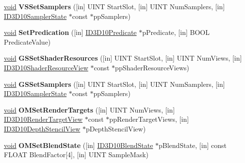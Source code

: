 \begin{DoxyCompactItemize}
\hyperlink{interfacevoid}{void} {\bfseries V\+S\+Set\+Samplers} (\mbox{[}in\mbox{]} U\+I\+NT Start\+Slot, \mbox{[}in\mbox{]} U\+I\+NT Num\+Samplers, \mbox{[}in\mbox{]} \hyperlink{interface_i_d3_d10_sampler_state}{I\+D3\+D10\+Sampler\+State} $\ast$const $\ast$pp\+Samplers)
\item 
\mbox{\label{interface_i_d3_d10_device_a479e83120b08a7be0742d63096b0d883}} 
\hyperlink{interfacevoid}{void} {\bfseries Set\+Predication} (\mbox{[}in\mbox{]} \hyperlink{interface_i_d3_d10_predicate}{I\+D3\+D10\+Predicate} $\ast$p\+Predicate, \mbox{[}in\mbox{]} B\+O\+OL Predicate\+Value)
\item 
\mbox{\label{interface_i_d3_d10_device_aa9fec48d096e7fb8b49b35e6c0209eda}} 
\hyperlink{interfacevoid}{void} {\bfseries G\+S\+Set\+Shader\+Resources} (\mbox{[}in\mbox{]} U\+I\+NT Start\+Slot, \mbox{[}in\mbox{]} U\+I\+NT Num\+Views, \mbox{[}in\mbox{]} \hyperlink{interface_i_d3_d10_shader_resource_view}{I\+D3\+D10\+Shader\+Resource\+View} $\ast$const $\ast$pp\+Shader\+Resource\+Views)
\item 
\mbox{\label{interface_i_d3_d10_device_a05a0765b1acbe6148dd96b9953fed9af}} 
\hyperlink{interfacevoid}{void} {\bfseries G\+S\+Set\+Samplers} (\mbox{[}in\mbox{]} U\+I\+NT Start\+Slot, \mbox{[}in\mbox{]} U\+I\+NT Num\+Samplers, \mbox{[}in\mbox{]} \hyperlink{interface_i_d3_d10_sampler_state}{I\+D3\+D10\+Sampler\+State} $\ast$const $\ast$pp\+Samplers)
\item 
\mbox{\label{interface_i_d3_d10_device_a5c010dbaa4d0118024a31a901c4270e9}} 
\hyperlink{interfacevoid}{void} {\bfseries O\+M\+Set\+Render\+Targets} (\mbox{[}in\mbox{]} U\+I\+NT Num\+Views, \mbox{[}in\mbox{]} \hyperlink{interface_i_d3_d10_render_target_view}{I\+D3\+D10\+Render\+Target\+View} $\ast$const $\ast$pp\+Render\+Target\+Views, \mbox{[}in\mbox{]} \hyperlink{interface_i_d3_d10_depth_stencil_view}{I\+D3\+D10\+Depth\+Stencil\+View} $\ast$p\+Depth\+Stencil\+View)
\item 
\mbox{\label{interface_i_d3_d10_device_a4b102a73ea3012820099f117521ef15c}} 
\hyperlink{interfacevoid}{void} {\bfseries O\+M\+Set\+Blend\+State} (\mbox{[}in\mbox{]} \hyperlink{interface_i_d3_d10_blend_state}{I\+D3\+D10\+Blend\+State} $\ast$p\+Blend\+State, \mbox{[}in\mbox{]} const F\+L\+O\+AT Blend\+Factor\mbox{[}4\mbox{]}, \mbox{[}in\mbox{]} U\+I\+NT Sample\+Mask)

\end{DoxyCompactItemize}
